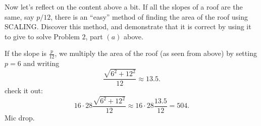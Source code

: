 \documentclass[hints,nooutcomes,noauthor,handout]{ximera}
\begin{document}
\mynewpage


\begin{question}
  Now let's reflect on the content above a bit. If all the slopes of a
  roof are the same, say $p/12$, there is an ``easy'' method of
  finding the area of the roof using SCALING. Discover this method,
  and demonstrate that it is correct by using it to give to solve
  Problem $2$, part $(a)$ above.
  \begin{freeResponse}
  If the slope is $\frac{p}{12}$, we multiply the area of the roof (as
  seen from above) by setting $p = 6$ and writing
    \[
    \frac{\sqrt{6^2+12^2}}{12} \approx 13.5.
    \]
    check it out:
    \[
    16\cdot 28 \frac{\sqrt{6^2+12^2}}{12} \approx 16\cdot 28 \frac{13.5}{12} = 504.
    \]
    Mic drop.
  \end{freeResponse}
\end{question}
\end{document}
